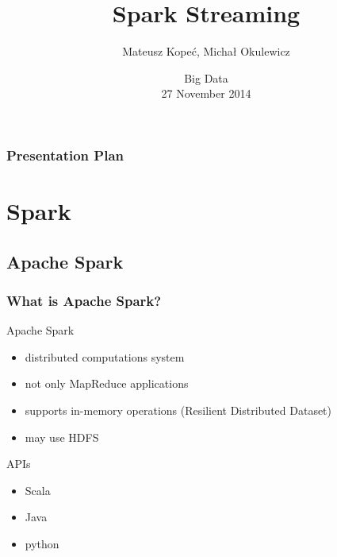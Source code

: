 \documentclass{beamer}
\title[Spark Streaming] %
{Spark Streaming}
\author [Kope{\'c}, Okulewicz]
{Mateusz Kope{\'c}, Micha{\l} Okulewicz}
\institute[ICS PAS]
{
Institute of Computer Science\\
Polish Academy of Sciences}
\date %
{Big Data \\27 November 2014}
\begin{document}
\begin{frame}
  \titlepage
\end{frame}

\begin{frame}
  \frametitle{Presentation Plan}
  \tableofcontents
\end{frame}

\section{Spark}

\subsection*{Apache Spark\texttrademark}
\begin{frame}
\frametitle{What is Apache Spark\texttrademark?}

\begin{block}{Apache Spark\texttrademark}
\begin{itemize}
	\item distributed computations system
	\item not only MapReduce applications
	\item supports in-memory operations (Resilient Distributed Dataset)
	\item may use HDFS
\end{itemize}
\end{block}

\begin{block}{APIs}
\begin{itemize}
	\item Scala
	\item Java
	\item python
\end{itemize}
\end{block}

\end{frame}
\end{document}
